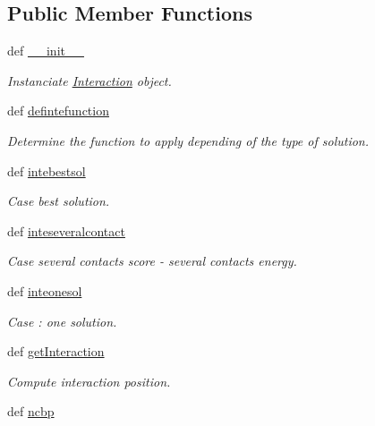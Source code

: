 \subsection*{\-Public \-Member \-Functions}
\begin{DoxyCompactItemize}
\item 
def \hyperlink{classMycarn__stat_1_1Interaction_1_1Interaction_ac46c0d97c7e0ee7cf0231d2586dd3831}{\-\_\-\-\_\-init\-\_\-\-\_\-}
\begin{DoxyCompactList}\small\item\em \-Instanciate \hyperlink{classMycarn__stat_1_1Interaction_1_1Interaction}{\-Interaction} object. \end{DoxyCompactList}\item 
\hypertarget{classMycarn__stat_1_1Interaction_1_1Interaction_aae536f9993066a38a5976b31ecb7822b}{
def \hyperlink{classMycarn__stat_1_1Interaction_1_1Interaction_aae536f9993066a38a5976b31ecb7822b}{defintefunction}}
\label{classMycarn__stat_1_1Interaction_1_1Interaction_aae536f9993066a38a5976b31ecb7822b}

\begin{DoxyCompactList}\small\item\em \-Determine the function to apply depending of the type of solution. \end{DoxyCompactList}\item 
def \hyperlink{classMycarn__stat_1_1Interaction_1_1Interaction_a9444512264f2a71d62b7fe88ab3fecd0}{intebestsol}
\begin{DoxyCompactList}\small\item\em \-Case best solution. \end{DoxyCompactList}\item 
def \hyperlink{classMycarn__stat_1_1Interaction_1_1Interaction_a55b0da50c3831a09243035f65a7750b5}{inteseveralcontact}
\begin{DoxyCompactList}\small\item\em \-Case several contacts score -\/ several contacts energy. \end{DoxyCompactList}\item 
def \hyperlink{classMycarn__stat_1_1Interaction_1_1Interaction_aa1589fbb05fd93233398359cfe05c986}{inteonesol}
\begin{DoxyCompactList}\small\item\em \-Case \-: one solution. \end{DoxyCompactList}\item 
def \hyperlink{classMycarn__stat_1_1Interaction_1_1Interaction_a4e6ecded62d3b7beb8e21f34c48e832f}{get\-Interaction}
\begin{DoxyCompactList}\small\item\em \-Compute interaction position. \end{DoxyCompactList}\item 
\hypertarget{classMycarn__stat_1_1Interaction_1_1Interaction_ae08a1a1d016673624575f20826f84a04}{
def \hyperlink{classMycarn__stat_1_1Interaction_1_1Interaction_ae08a1a1d016673624575f20826f84a04}{ncbp}}
\label{classMycarn__stat_1_1Interaction_1_1Interaction_ae08a1a1d016673624575f20826f84a04}


\end{DoxyCompactItemize}
